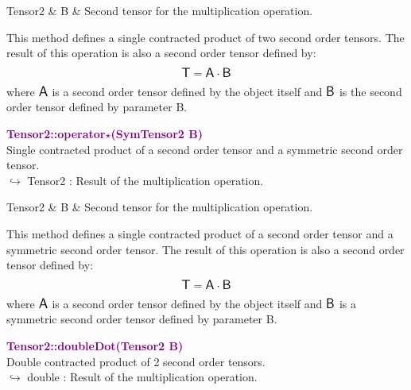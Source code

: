 \begin{tcolorbox}[width=\textwidth,myArgs,tabularx={ll|R}]
Tensor2 & B & Second tensor for the multiplication operation.
\end{tcolorbox}

This method defines a single contracted product of two second order tensors.
The result of this operation is also a second order tensor defined by:
\begin{equation*}
\mbox{\large\ensuremath{\mathsf{T}}} = \mbox{\large\ensuremath{\mathsf{A}}} \cdot \mbox{\large\ensuremath{\mathsf{B}}}
\end{equation*}
where $\mbox{\large\ensuremath{\mathsf{A}}}$ is a second order tensor defined by the object itself and $\mbox{\large\ensuremath{\mathsf{B}}}$ is the second order tensor defined by parameter B.

\textcolor{purple}{\textbf{Tensor2::operator$\star$(SymTensor2 B)}}\label{Tensor2::operator*(SymTensor2 B)}\\
Single contracted product of a second order tensor and a symmetric second order tensor.\\ \hspace*{10mm}$\hookrightarrow$ Tensor2 : Result of the multiplication operation.

\begin{tcolorbox}[width=\textwidth,myArgs,tabularx={ll|R}]
Tensor2 & B & Second tensor for the multiplication operation.
\end{tcolorbox}

This method defines a single contracted product of a second order tensor and a symmetric second order tensor.
The result of this operation is also a second order tensor defined by:
\begin{equation*}
\mbox{\large\ensuremath{\mathsf{T}}} = \mbox{\large\ensuremath{\mathsf{A}}} \cdot \mbox{\large\ensuremath{\mathsf{B}}}
\end{equation*}
where $\mbox{\large\ensuremath{\mathsf{A}}}$ is a second order tensor defined by the object itself and $\mbox{\large\ensuremath{\mathsf{B}}}$ is a symmetric second order tensor defined by parameter B.

\textcolor{purple}{\textbf{Tensor2::doubleDot(Tensor2 B)}}\label{Tensor2::doubleDot(Tensor2 B)}\\
Double contracted product of 2 second order tensors.\\ \hspace*{10mm}$\hookrightarrow$ double : Result of the multiplication operation.

